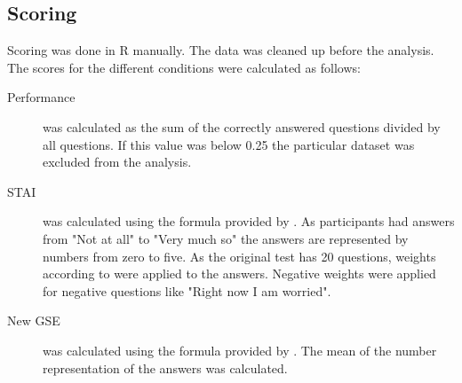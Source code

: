 \subsection{Scoring}
Scoring was done in R manually. The data was cleaned up before the analysis.
The scores for the different conditions were calculated as follows:
\begin{description}
  \item[Performance] was calculated as the sum of the correctly answered questions divided by all questions. If this value was below 0.25 the particular dataset was excluded from the analysis.
  \item[STAI] was calculated using the formula provided by \textcite{marteauDevelopmentSixitemShortform1992}. As participants had answers from "Not at all" to "Very much so" the answers are represented by numbers from zero to five. As the original test has 20 questions, weights according to \textcite{marteauDevelopmentSixitemShortform1992} were applied to the answers. Negative weights were applied for negative questions like "Right now I am worried".
  \item[New GSE] was calculated using the formula provided by \textcite{guayAssessmentSituationalIntrinsic2000}. The mean of the number representation of the answers was calculated.
  \item[] 
\end{description}